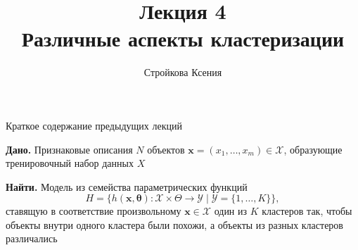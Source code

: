 \documentclass[aspectratio=169]{beamer}
\author{Стройкова Ксения}
\title{\newline \newline \newline Лекция 4 \\ Различные аспекты кластеризации}
\let\otp\titlepage
\renewcommand{\titlepage}{\otp\addtocounter{framenumber}{-1}}
\begin{document}
\begin{frame}[plain]
\titlepage
\end{frame}

\begin{frame}{Краткое содержание предыдущих лекций}

\vspace{1em}
{\bf Дано.} Признаковые описания $N$ объектов $\mathbf{x} = (x_1, \ldots, x_m) \in \mathcal{X}$, образующие тренировочный набор данных $X$

\vspace{1em}
{\bf Найти.} Модель из семейства параметрических функций
\[
H = \{h(\mathbf{x, \mathbf{\theta}}): \mathcal{X} \times \Theta \rightarrow \mathcal{Y} \mid \mathcal{Y} = \{1, \ldots, K\}\},
\]
ставящую в соответствие произвольному $\mathbf{x} \in \mathcal{X}$ один из $K$ кластеров так, чтобы объекты внутри одного кластера были похожи, а объекты из разных кластеров различались

\end{frame}
\end{document}
